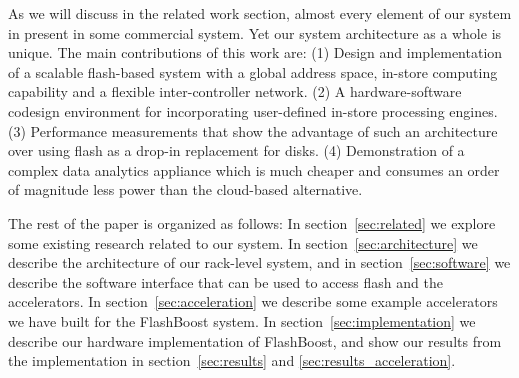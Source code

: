 As we will discuss in the related work section, almost every element of our
system in present in some commercial system. Yet our system architecture as a
whole is unique.  The main contributions of this work are: (1) Design and
implementation of a scalable flash-based system with a global address space,
in-store computing capability and a flexible inter-controller network. (2) A
hardware-software codesign environment for incorporating user-defined in-store
processing engines. (3) Performance measurements that show the advantage of such
an architecture over using flash as a drop-in replacement for disks. (4)
Demonstration of a complex data analytics appliance which is much cheaper and
consumes an order of magnitude less power than the cloud-based alternative.

The rest of the paper is organized as follows: In section~\ref{sec:related} we
explore some existing research related to our system. In
section~\ref{sec:architecture} we describe the architecture of our rack-level
system, and in section~\ref{sec:software} we describe the software interface
that can be used to access flash and the accelerators. In
section~\ref{sec:acceleration} we describe some example accelerators we have
built for the FlashBoost system. In section~\ref{sec:implementation} we describe
our hardware implementation of FlashBoost, and show our results from the
implementation in section~\ref{sec:results} and \ref{sec:results_acceleration}.



